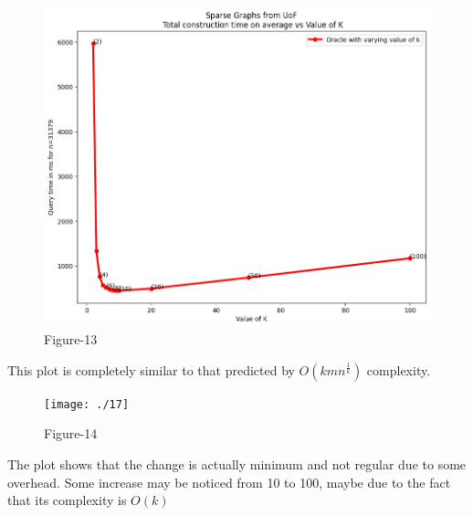 \documentclass[12pt, a4paper]{article}
\begin{document}
    \begin{figure}[H]
    \caption*{Figure-13}
    
        \centering
    \includegraphics[scale=0.75]{./sparse/8}
    \end{figure}
    This plot is completely similar to that predicted  by $O(kmn^{\frac{1}{k}})$ complexity.

\begin{figure}[H]
    \caption*{Figure-14}    
        \centering
    \texttt{[image: ./17]}
    \end{figure}
    The plot shows that the change is actually minimum and not regular due to some overhead. Some increase may be noticed from 10 to 100, maybe due to the fact that its complexity is $O(k)$
\end{document}
